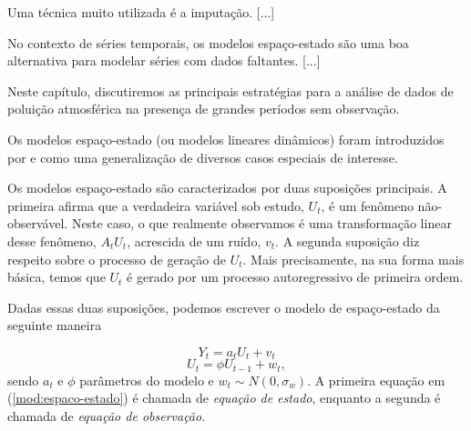 Uma técnica muito utilizada é a imputação. [...]

No contexto de séries temporais, os modelos espaço-estado são uma boa alternativa para modelar séries com dados faltantes. [...]

Neste capítulo, discutiremos as principais estratégias para a análise de dados de poluição atmosférica na presença de grandes períodos sem observação.


Os modelos espaço-estado (ou modelos lineares dinâmicos) foram introduzidos por \cite{Kalman1960} e \cite{Kalman1961} como uma generalização de diversos casos especiais de interesse. 

Os modelos espaço-estado são caracterizados por duas suposições principais. A primeira afirma que a verdadeira variável sob estudo, $U_t$, é um fenômeno não-observável. Neste caso, o que realmente observamos é uma transformação linear desse fenômeno, $A_tU_t$, acrescida de um ruído, $v_t$. A segunda suposição diz respeito sobre o processo de geração de $U_t$. Mais precisamente, na sua forma mais básica, temos que $U_t$ é gerado por um processo autoregressivo de primeira ordem.

Dadas essas duas suposições, podemos escrever o modelo de espaço-estado da seguinte maneira

\begin{displaymath}
Y_t = a_tU_t + v_t
\end{displaymath}
\begin{equation}
U_t = \phi U_{t-1} + w_t,
\label{mod:espaco-estado}
\end{equation}
sendo $a_t$ e $\phi$ parâmetros do modelo e $w_t \sim N(0, \sigma_w)$. A primeira equação em (\ref{mod:espaco-estado}) é chamada de \textit{equação de estado}, enquanto a segunda é chamada de \textit{equação de observação}.



